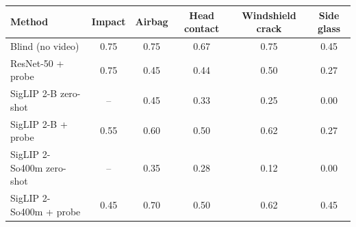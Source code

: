 \begin{tabular}{lccccc}
\toprule
Method & Impact & Airbag & Head contact & Windshield crack & Side glass \\
\midrule
Blind (no video) & 0.75 & 0.75 & 0.67 & 0.75 & 0.45 \\
ResNet-50 + probe & 0.75 & 0.45 & 0.44 & 0.50 & 0.27 \\
SigLIP 2-B zero-shot & -- & 0.45 & 0.33 & 0.25 & 0.00 \\
SigLIP 2-B + probe & 0.55 & 0.60 & 0.50 & 0.62 & 0.27 \\
SigLIP 2-So400m zero-shot & -- & 0.35 & 0.28 & 0.12 & 0.00 \\
SigLIP 2-So400m + probe & 0.45 & 0.70 & 0.50 & 0.62 & 0.45 \\
\bottomrule
\end{tabular}
